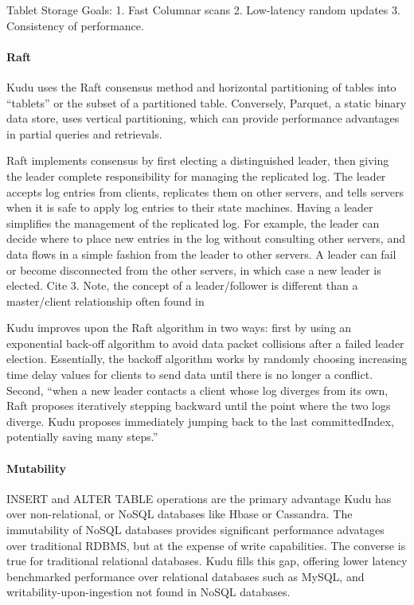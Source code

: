 \begin{enumerate}
Tablet Storage Goals: 
1. Fast Columnar scans
2. Low-latency random updates
3. Consistency of performance.
\end{enumerate}

\paragraph{Raft}
Kudu uses the Raft consensus method and horizontal partitioning of
tables into ``tablets'' or the subset of a partitioned table.
Conversely, Parquet, a static binary data store, uses vertical
partitioning, which can provide performance advantages in partial
queries and retrievals. 

Raft implements consensus by first electing a distinguished leader,
then giving the leader complete responsibility for managing the
replicated log. The leader accepts log entries from clients,
replicates them on other servers, and tells servers when it is safe
to apply log entries to their state machines. Having a leader
simplifies the management of the replicated log. For example, the
leader can decide where to place new entries in the log without
consulting other servers, and data flows in a simple fashion from the
leader to other servers. A leader can fail or become disconnected
from the other servers, in which case a new leader is elected.  Cite
3. Note, the concept of a leader/follower is different than a
master/client relationship often found in 

Kudu improves upon the Raft algorithm in two ways: first by using an
exponential back-off algorithm to avoid data packet collisions after
a failed leader election. Essentially, the backoff algorithm works by
randomly choosing increasing time delay values for clients to send
data until there is no longer a conflict. Second, ``when a new leader
contacts a client whose log diverges from its own, Raft proposes
iteratively stepping backward until the point where the two logs
diverge. Kudu proposes immediately jumping back to the last
committedIndex, potentially saving many steps.''
~\cite{hid-sp18-407-kudu-intro}

\paragraph{Mutability} 
INSERT and ALTER TABLE operations are the primary advantage Kudu has
over non-relational, or NoSQL databases like Hbase or Cassandra. The
immutability of NoSQL databases provides significant performance
advatages over traditional RDBMS, but at the expense of write
capabilities. The converse is true for traditional relational
databases.  Kudu fills this gap, offering lower latency benchmarked
performance over relational databases such as MySQL, and
writability-upon-ingestion not found in NoSQL databases. 

